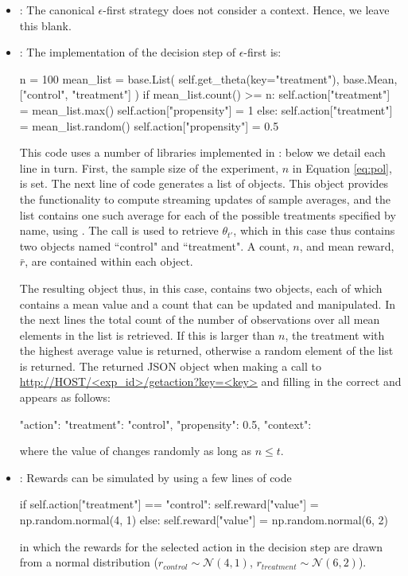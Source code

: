 \documentclass[nojss]{jss}
\begin{document}
\begin{itemize}

\item {}: The canonical $\epsilon$-first strategy does not consider a context. Hence, we leave this blank.
\item {}: The implementation of the decision step of $\epsilon$-first is:
\begin{Code}
n = 100
mean_list = base.List(
             self.get_theta(key="treatment"), 
             base.Mean, ["control", "treatment"]
             )
if mean_list.count() >= n:
    self.action["treatment"] = mean_list.max()
    self.action["propensity"] = 1
else:
    self.action["treatment"] = mean_list.random()
    self.action["propensity"] = 0.5
\end{Code}
This code uses a number of libraries implemented in : below we detail each line in turn. First, the sample size of the experiment, $n$ in Equation \ref{eq:pol}, is set. The next line of code generates a list of  objects. This object provides the functionality to compute streaming updates of sample averages, and the list contains one such average for each of the possible treatments specified by name, using . The  call is used to retrieve $\theta_{t'}$, which in this case thus contains two  objects named ``control" and ``treatment". A count, $n$, and mean reward, $\bar{r}$, are contained within each   object.

The resulting  object thus, in this case, contains two  objects, each of which contains a mean value and a count that can be updated and manipulated. In the next lines the total count of the number of observations over all mean elements in the list is retrieved. If this is larger than $n$, the treatment with the highest average value is returned, otherwise a random element of the list is returned. The returned JSON object when making a call to \url{http://HOST/<exp_id>/getaction?key=<key>} and filling in the correct  and  appears as follows:
\begin{Code}
{"action": 
     {"treatment": "control", 
     "propensity": 0.5},
"context": {}}
\end{Code}
where the value of  changes randomly as long as $n \leq t$.


\item {}: Rewards can be simulated by using a few lines of  code
\begin{Code}
if self.action["treatment"] == "control":
    self.reward["value"] = np.random.normal(4, 1)
else:
    self.reward["value"] = np.random.normal(6, 2)
\end{Code}
in which the rewards for the selected action in the decision step are drawn from a normal distribution ($r_{control} \sim \mathcal{N}(4, 1)$, $r_{treatment} \sim \mathcal{N}(6, 2)$).


\end{itemize}
\end{document}
